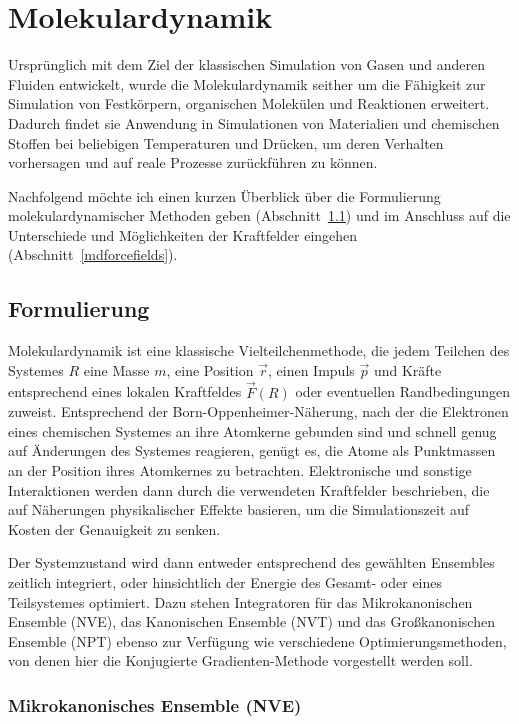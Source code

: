 \section{Molekulardynamik}
\label{md}

Ursprünglich mit dem Ziel der klassischen Simulation von Gasen und anderen Fluiden entwickelt, wurde die Molekulardynamik seither um die Fähigkeit zur Simulation von Festkörpern, organischen Molekülen und Reaktionen erweitert.
Dadurch findet sie Anwendung in Simulationen von Materialien und chemischen Stoffen bei beliebigen Temperaturen und Drücken, um deren Verhalten vorhersagen und auf reale Prozesse zurückführen zu können.

Nachfolgend möchte ich einen kurzen Überblick über die Formulierung molekulardynamischer Methoden geben (Abschnitt~\ref{mdformulation}) und im Anschluss auf die Unterschiede und Möglichkeiten der Kraftfelder eingehen (Abschnitt~\ref{mdforcefields}).

\subsection{Formulierung}
\label{mdformulation}

Molekulardynamik ist eine klassische Vielteilchenmethode, die jedem Teilchen des Systemes $R$ eine Masse $m$, eine Position $\vec r$, einen Impuls $\vec p$ und Kräfte entsprechend eines lokalen Kraftfeldes $\vec{F}(R)$ oder eventuellen Randbedingungen zuweist.
Entsprechend der Born-Oppenheimer-Näherung, nach der die Elektronen eines chemischen Systemes an ihre Atomkerne gebunden sind und schnell genug auf Änderungen des Systemes reagieren, genügt es, die Atome als Punktmassen an der Position ihres Atomkernes zu betrachten.
Elektronische und sonstige Interaktionen werden dann durch die verwendeten Kraftfelder beschrieben, die auf Näherungen physikalischer Effekte basieren, um die Simulationszeit auf Kosten der Genauigkeit zu senken.

Der Systemzustand wird dann entweder entsprechend des gewählten Ensembles zeitlich integriert, oder hinsichtlich der Energie des Gesamt- oder eines Teilsystemes optimiert.
Dazu stehen Integratoren für das Mikrokanonischen Ensemble (NVE), das Kanonischen Ensemble (NVT) und das Großkanonischen Ensemble (NPT) ebenso zur Verfügung wie verschiedene Optimierungsmethoden, von denen hier die Konjugierte Gradienten-Methode vorgestellt werden soll.

\subsubsection{Mikrokanonisches Ensemble (NVE)}

